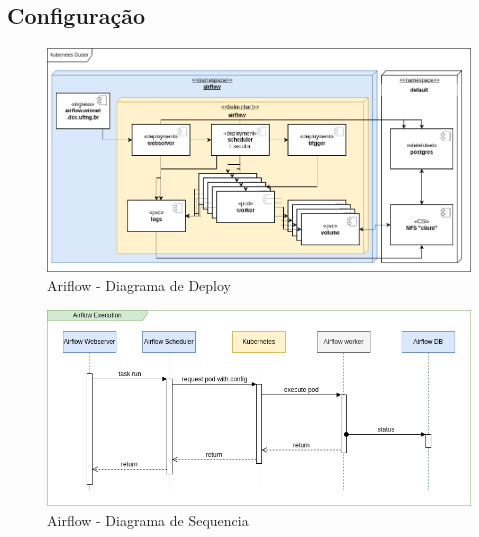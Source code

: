 \documentclass[10pt,brazil]{beamer}
\theoremstyle{definition}
\begin{document}
\subsection{Configuração}

\begin{frame}[plain]
  \hspace*{-10mm}
  \begin{figure}
    \centering  
  \includegraphics[width=0.85\paperwidth]{tcc_airflow_deloy.png}
  \caption[AirFlow Deploy]{Ariflow - Diagrama de Deploy}
\end{figure}
\end{frame}

\begin{frame}[plain]
  \hspace*{-10mm}
    \begin{figure}
    \centering  
  \includegraphics[width=.85\paperwidth]{airflow_sequence.png}
      \caption[Airflow - Diagrama de Sequencia]{Airflow - Diagrama de Sequencia}
  \end{figure}  
\end{frame}
\end{document}
